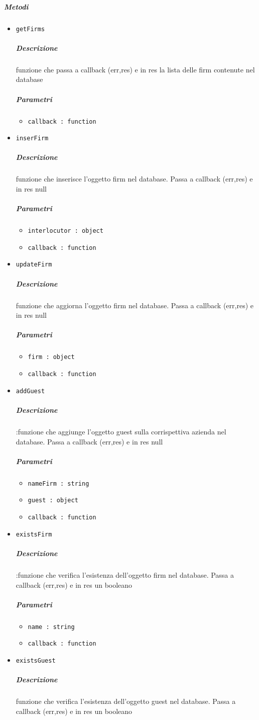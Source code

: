 \documentclass[../ManualeSviluppatore_v1.0.0.tex]{subfiles}
\begin{document}
\subparagraph{Metodi}\begin{itemize}
\item \texttt{getFirms}
\subparagraph{Descrizione} funzione che passa a callback (err,res) e in res la lista delle firm contenute nel database
\subparagraph{Parametri} \begin{itemize}
\item \texttt{callback : function}
\end{itemize}
\item \texttt{inserFirm}
\subparagraph{Descrizione} funzione che inserisce l'oggetto firm nel database. Passa a callback (err,res) e in res null
\subparagraph{Parametri} \begin{itemize}
\item \texttt{interlocutor : object}
\item \texttt{callback : function}
\end{itemize}
\item \texttt{updateFirm}
\subparagraph{Descrizione} funzione che aggiorna l'oggetto firm nel database. Passa a callback (err,res) e in res null
\subparagraph{Parametri} \begin{itemize}
\item \texttt{firm : object}
\item \texttt{callback : function}
\end{itemize}
\item \texttt{addGuest}
\subparagraph{Descrizione} :funzione che aggiunge l'oggetto guest sulla corrispettiva azienda nel database. Passa a callback (err,res) e in res null
\subparagraph{Parametri} \begin{itemize}
\item \texttt{nameFirm : string}
\item \texttt{guest : object}
\item \texttt{callback : function}
\end{itemize}
\item \texttt{existsFirm}
\subparagraph{Descrizione} :funzione che verifica l'esistenza dell'oggetto firm nel database. Passa a callback (err,res) e in res un booleano
\subparagraph{Parametri} \begin{itemize}
\item \texttt{name : string}
\item \texttt{callback : function}
\end{itemize}
\item \texttt{existsGuest}
\subparagraph{Descrizione} funzione che verifica l'esistenza dell'oggetto guest nel database. Passa a callback (err,res) e in res un booleano

\end{itemize}
\end{document}
